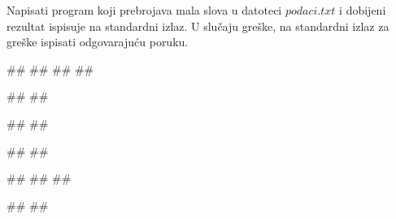 \begin{Answer}[ref=p3_iv3]
\end{Answer}


\begin{Exercise}[label=p3_01] 
Napisati program koji prebrojava mala slova u datoteci $podaci.txt$ i dobijeni rezultat ispisuje na
standardni izlaz.
U slučaju greške, na standardni izlaz za greške ispisati odgovarajuću poruku.

\begin{minitest}
\begin{upotreba}{1}
##
##
##
##

#\naslovIzlaz#
##
\end{upotreba}
\end{minitest}
\begin{minitest}
\begin{upotreba}{2}
##
##

#\naslovIzlaz#
##
\end{upotreba}
\end{minitest}
\begin{minitest}
\begin{upotreba}{3}
##
##
##

#\naslovIzlaz#
##
\end{upotreba}
\end{minitest}
\end{Exercise}
\begin{Answer}[ref=p3_01]
\end{Answer}


